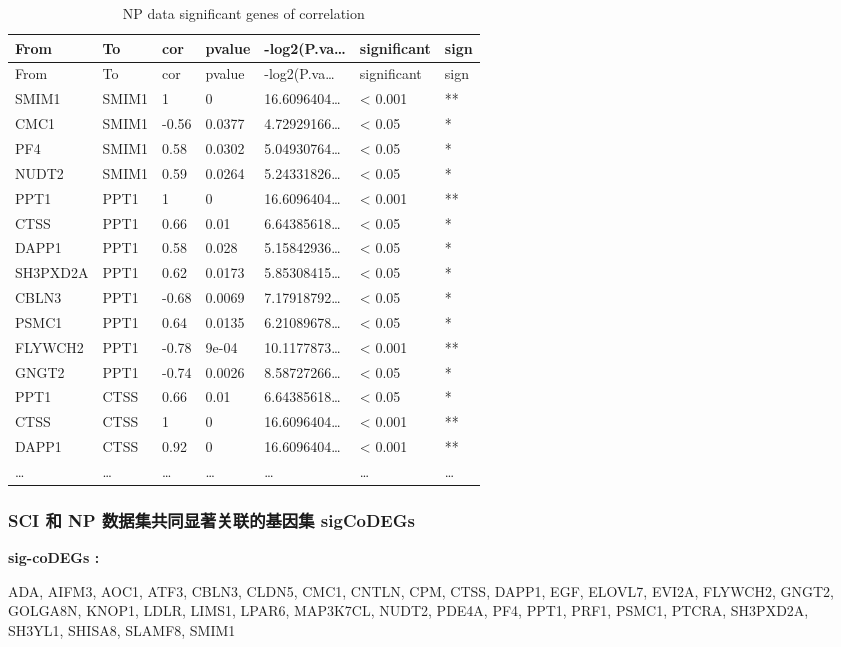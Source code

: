 \documentclass[
]{article}
\begin{document}
\begin{longtable}[]{@{}lllllll@{}}
\caption{\label{tab:NP-data-significant-genes-of-correlation}NP data significant genes of correlation}\tabularnewline
\toprule
From & To & cor & pvalue & -log2(P.va\ldots{} & significant & sign\tabularnewline
\midrule
\endfirsthead
\toprule
From & To & cor & pvalue & -log2(P.va\ldots{} & significant & sign\tabularnewline
\midrule
\endhead
SMIM1 & SMIM1 & 1 & 0 & 16.6096404\ldots{} & \textless{} 0.001 & **\tabularnewline
CMC1 & SMIM1 & -0.56 & 0.0377 & 4.72929166\ldots{} & \textless{} 0.05 & *\tabularnewline
PF4 & SMIM1 & 0.58 & 0.0302 & 5.04930764\ldots{} & \textless{} 0.05 & *\tabularnewline
NUDT2 & SMIM1 & 0.59 & 0.0264 & 5.24331826\ldots{} & \textless{} 0.05 & *\tabularnewline
PPT1 & PPT1 & 1 & 0 & 16.6096404\ldots{} & \textless{} 0.001 & **\tabularnewline
CTSS & PPT1 & 0.66 & 0.01 & 6.64385618\ldots{} & \textless{} 0.05 & *\tabularnewline
DAPP1 & PPT1 & 0.58 & 0.028 & 5.15842936\ldots{} & \textless{} 0.05 & *\tabularnewline
SH3PXD2A & PPT1 & 0.62 & 0.0173 & 5.85308415\ldots{} & \textless{} 0.05 & *\tabularnewline
CBLN3 & PPT1 & -0.68 & 0.0069 & 7.17918792\ldots{} & \textless{} 0.05 & *\tabularnewline
PSMC1 & PPT1 & 0.64 & 0.0135 & 6.21089678\ldots{} & \textless{} 0.05 & *\tabularnewline
FLYWCH2 & PPT1 & -0.78 & 9e-04 & 10.1177873\ldots{} & \textless{} 0.001 & **\tabularnewline
GNGT2 & PPT1 & -0.74 & 0.0026 & 8.58727266\ldots{} & \textless{} 0.05 & *\tabularnewline
PPT1 & CTSS & 0.66 & 0.01 & 6.64385618\ldots{} & \textless{} 0.05 & *\tabularnewline
CTSS & CTSS & 1 & 0 & 16.6096404\ldots{} & \textless{} 0.001 & **\tabularnewline
DAPP1 & CTSS & 0.92 & 0 & 16.6096404\ldots{} & \textless{} 0.001 & **\tabularnewline
\ldots{} & \ldots{} & \ldots{} & \ldots{} & \ldots{} & \ldots{} & \ldots{}\tabularnewline
\bottomrule
\end{longtable}

\hypertarget{sigCoDEGs}{%
\subsubsection{SCI 和 NP 数据集共同显著关联的基因集 sigCoDEGs}\label{sigCoDEGs}}

\begin{center}\begin{tcolorbox}[colback=gray!10, colframe=gray!50, width=0.9\linewidth, arc=1mm, boxrule=0.5pt]
\textbf{
sig-coDEGs
:}

\vspace{0.5em}

    ADA, AIFM3, AOC1, ATF3, CBLN3, CLDN5, CMC1, CNTLN, CPM,
CTSS, DAPP1, EGF, ELOVL7, EVI2A, FLYWCH2, GNGT2, GOLGA8N,
KNOP1, LDLR, LIMS1, LPAR6, MAP3K7CL, NUDT2, PDE4A, PF4,
PPT1, PRF1, PSMC1, PTCRA, SH3PXD2A, SH3YL1, SHISA8, SLAMF8,
SMIM1

\vspace{2em}
\end{tcolorbox}
\end{center}
\end{document}

